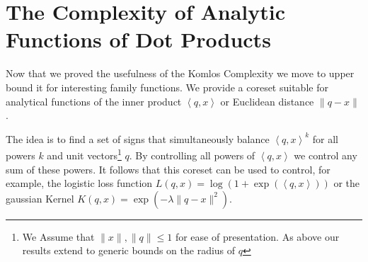 \documentclass[anon,12pt]{colt2019} %
\newcommand{\ip}[1]{\left \langle #1 \right \rangle}
\newcommand{\eps}{\epsilon}
\begin{document}
\begin{itemize}
\end{itemize}




\section{The Complexity of Analytic Functions of Dot Products} \label{sec:analytic}

Now that we proved the usefulness of the Komlos Complexity we move to upper bound it for interesting family functions. We provide a coreset suitable for analytical functions of the inner product $\ip{q,x}$ or Euclidean distance $\|q-x\|$. 

The idea is to find a set of signs that simultaneously balance $\ip{q,x}^k$ for all powers $k$ and unit vectors\footnote{We Assume that $\|x\|,\|q\| \leq 1$ for ease of presentation. As above our results extend to generic bounds on the radius of $q$} $q$. By controlling all powers of $\ip{q,x}$ we control any sum of these powers. It follows that this coreset can be used to control, for example, the logistic loss function $L(q,x) = \log(1+\exp(\ip{q,x}))$ or the gaussian Kernel $K(q,x) = \exp(-\lambda \|q-x\|^2)$. 
\end{document}
